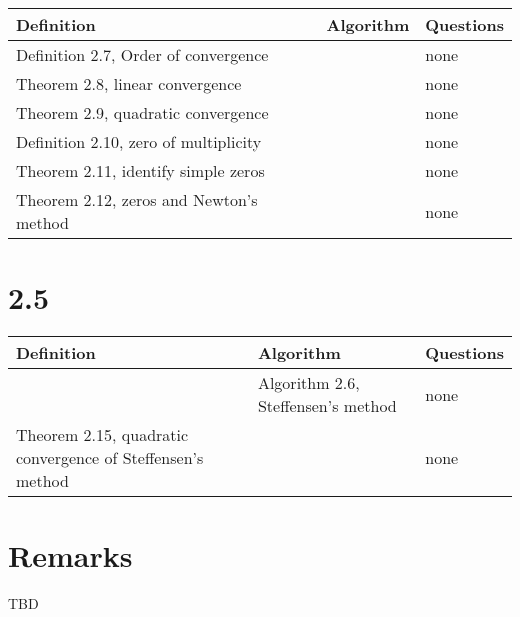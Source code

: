 \documentclass{article}
\begin{document}
\begin{tabularx}{\textwidth}{ |X|X|X| }
    \hline
	{\bf Definition} & {\bf Algorithm} & {\bf Questions} \\
    \hline
	Definition 2.7, Order of convergence & & none \\
    \hline
	Theorem 2.8, linear convergence & & none \\
    \hline
	Theorem 2.9, quadratic convergence & & none \\
    \hline
	Definition 2.10, zero of multiplicity & & none \\
    \hline
	Theorem 2.11, identify simple zeros & & none \\
    \hline
	Theorem 2.12, zeros and Newton's method & & none \\
    \hline
\end{tabularx}

\section*{2.5}

\begin{tabularx}{\textwidth}{ |X|X|X| }
    \hline
	{\bf Definition} & {\bf Algorithm} & {\bf Questions} \\
    \hline
	 & Algorithm 2.6, Steffensen's method & none \\
    \hline
	Theorem 2.15, quadratic convergence of Steffensen's method & & none \\
    \hline
\end{tabularx}

\section*{Remarks}

TBD
\end{document}
